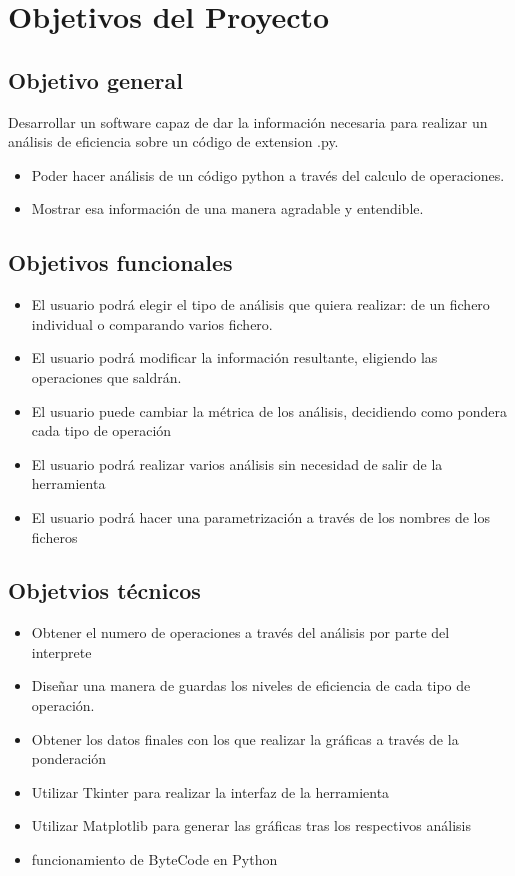 
\section{Objetivos del Proyecto}

\subsection{Objetivo general}


Desarrollar un software capaz de dar la información necesaria para realizar un análisis de eficiencia sobre un código de extension .py.
\begin{itemize}
	\item Poder hacer análisis de un código python a través del calculo de operaciones.
	\item Mostrar esa información de una manera agradable y entendible.
\end{itemize}


\subsection{Objetivos funcionales}
	\begin{itemize}
	\item El usuario podrá elegir el tipo de análisis que quiera realizar: de un fichero individual o comparando varios fichero.
	\item El usuario podrá modificar la información resultante, eligiendo las operaciones que saldrán.
	\item El usuario puede cambiar la métrica de los análisis, decidiendo como pondera cada tipo de operación
	\item El usuario podrá realizar varios análisis sin necesidad de salir de la herramienta
	\item El usuario podrá hacer una parametrización a través de los  nombres de los ficheros
\end{itemize}


\subsection{Objetvios técnicos}
	\begin{itemize}
	\item Obtener el numero de operaciones a través del análisis por parte del interprete
	\item Diseñar una manera de guardas los niveles de eficiencia de cada tipo de operación.
	\item Obtener los datos finales con los que realizar la  gráficas a través de la ponderación
	\item Utilizar Tkinter para realizar la interfaz de la herramienta
	\item Utilizar Matplotlib  para generar las gráficas tras los respectivos análisis
	\item funcionamiento de ByteCode en Python
\end{itemize}
